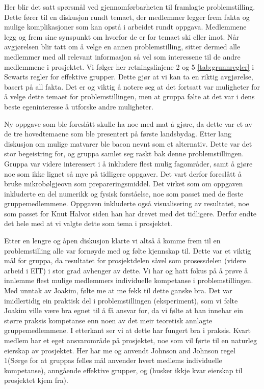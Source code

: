 Her blir det satt spørsmål ved gjennomførbarheten til framlagte problemstilling. Dette
fører til en diskusjon rundt temaet, der medlemmer legger frem fakta og mulige komplikasjoner 
som kan opstå i arbeidet rundt oppgava. Medlemmene legg og frem sine synspunkt om hvorfor 
de er for temaet ski eller imot. Når avgjørelsen blir tatt om å velge en
annen problemstilling, sitter dermed alle medlemmer med all relevant informasjon så vel som interessene 
til de andre medlemmene i prosjektet. Vi følger her retningslinjene 2 og 5 \ref{tab:grunnregler} i Scwarts
regler for effektive grupper. Dette gjør at vi kan ta en riktig avgjørelse, basert på all fakta. Det er og 
viktig å notere seg at det fortsatt var muligheter for å velge dette temaet for problemstillingen, men 
at gruppa følte at det var i dens beste egeninteresse å utforske andre muligheter. 

Ny oppgave som ble foreslått skulle ha noe med mat å gjøre, da dette var et av
de tre hovedtemaene som ble presentert på første landsbydag. Etter lang
diskusjon om mulige matvarer ble bacon nevnt som et alternativ. Dette var det
stor begeistring for, og gruppa samlet seg raskt bak denne problemstillingen.
Gruppa var videre interessert i å inkludere flest mulig fagområder, samt å
gjøre noe som ikke lignet så mye på tidligere oppgaver. Det vart derfor foreslått
å bruke mikrobølgjeovn som prepareringsmiddel. Det virket som om oppgaven inkluderte en del
numerikk og fysisk forståelse, noe som passet med de fleste gruppemedlemmene.
Oppgaven inkluderte også visualisering av resultatet, noe som passet for Knut
Halvor siden han har drevet med det tidligere. Derfor endte det hele
med at vi valgte dette som tema i prosjektet.

Etter en lengre og åpen diskusjon klarte vi altså å komme frem til en problemstilling 
alle var fornøyde med og følte kjennskap til. Dette var et viktig mål for gruppa, 
da resultatet for prosjektdelen såvel som prosessdelen (videre arbeid i EIT) i stor 
grad avhenger av dette. Vi har og hatt fokus på å prøve å innlemme flest mulige medlemmers individuelle
kompetanse i problemstillingen. Med unntak av Joakim, følte me at me fekk til dette ganske bra.
Det var imidlertidig ein praktisk del i problemstillingen (eksperiment), som vi følte Joakim ville være bra egnet 
til å få ansvar for, da vi følte at han innehar ein større praksis kompetanse enn noen av det meir 
teoretisk annlagte gruppemedlemmene. I etterkant ser vi at dette har fungert bra i praksis.
Kvart medlem har et eget ansvarområde på prosjektet, noe som vil førte til en naturleg eierskap av prosjektet.
Her har me og anvendt Johnson and Johnson regel 1(Sørge for at gruppas felles mål anvender hvert medlems
individuelle kompetanse), anngående effektive grupper, og (husker ikkje kvar eierskap til
prosjektet kjem fra). 


